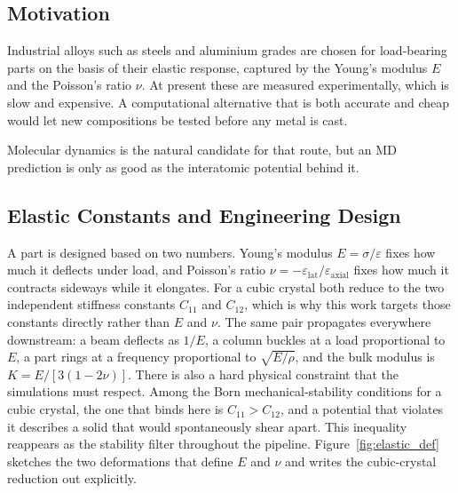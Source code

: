 \introduction

\subsection{Motivation}
Industrial alloys such as steels and aluminium grades are chosen for
load-bearing parts on the basis of their elastic response, captured by the
Young's modulus $E$ and the Poisson's ratio $\nu$. At present these are
measured experimentally, which is slow and expensive. A computational alternative
that is both accurate and cheap would let new compositions be tested before
any metal is cast.

Molecular dynamics is the natural candidate for that route, but an MD
prediction is only as good as the interatomic potential behind it.

\subsection{Elastic Constants and Engineering Design}
A part is designed based on two numbers. Young's modulus $E=\sigma/\varepsilon$
fixes how much it deflects under load, and Poisson's ratio
$\nu=-\varepsilon_\mathrm{lat}/\varepsilon_\mathrm{axial}$ fixes how much it
contracts sideways while it elongates. For a cubic crystal both reduce to the two
independent stiffness constants $C_{11}$ and $C_{12}$, which is why this work
targets those constants directly rather than $E$ and $\nu$. The same pair
propagates everywhere downstream: a beam deflects as $1/E$, a column buckles
at a load proportional to $E$, a part rings at a frequency proportional to
$\sqrt{E/\rho}$, and the bulk modulus is $K=E/[3(1-2\nu)]$. There is also a
hard physical constraint that the simulations must respect. Among the Born
mechanical-stability conditions for a cubic crystal, the one that binds here is
$C_{11}>C_{12}$, and a potential that violates it describes a solid that would
spontaneously shear apart. This inequality reappears as the stability filter
throughout the pipeline. Figure~\ref{fig:elastic_def} sketches the two deformations that
define $E$ and $\nu$ and writes the cubic-crystal reduction out explicitly.

